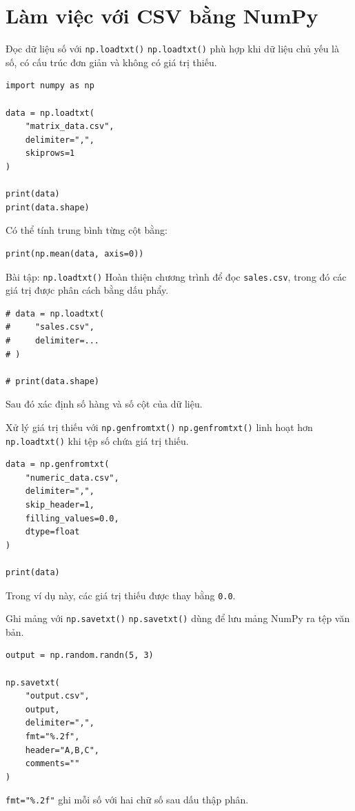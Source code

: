 \documentclass[aspectratio=169,11pt]{beamer}
\newcommand{\code}[1]{\texttt{#1}}
\begin{document}
\section{Làm việc với CSV bằng NumPy}

\begin{frame}[fragile]{Đọc dữ liệu số với \code{np.loadtxt()}}
\code{np.loadtxt()} phù hợp khi dữ liệu chủ yếu là số, có cấu trúc đơn giản và không có giá trị thiếu.

\begin{lstlisting}[style=pythonstyle]
import numpy as np

data = np.loadtxt(
    "matrix_data.csv",
    delimiter=",",
    skiprows=1
)

print(data)
print(data.shape)
\end{lstlisting}

Có thể tính trung bình từng cột bằng:
\begin{lstlisting}[style=pythonstyle]
print(np.mean(data, axis=0))
\end{lstlisting}
\end{frame}

\begin{frame}[fragile]{Bài tập: \code{np.loadtxt()}}
Hoàn thiện chương trình để đọc \code{sales.csv}, trong đó các giá trị được phân cách bằng dấu phẩy.

\begin{lstlisting}[style=pythonstyle]
# data = np.loadtxt(
#     "sales.csv",
#     delimiter=...
# )

# print(data.shape)
\end{lstlisting}

Sau đó xác định số hàng và số cột của dữ liệu.
\end{frame}

\begin{frame}[fragile]{Xử lý giá trị thiếu với \code{np.genfromtxt()}}
\code{np.genfromtxt()} linh hoạt hơn \code{np.loadtxt()} khi tệp số chứa giá trị thiếu.

\begin{lstlisting}[style=pythonstyle]
data = np.genfromtxt(
    "numeric_data.csv",
    delimiter=",",
    skip_header=1,
    filling_values=0.0,
    dtype=float
)

print(data)
\end{lstlisting}

Trong ví dụ này, các giá trị thiếu được thay bằng \code{0.0}.
\end{frame}

\begin{frame}[fragile]{Ghi mảng với \code{np.savetxt()}}
\code{np.savetxt()} dùng để lưu mảng NumPy ra tệp văn bản.

\begin{lstlisting}[style=pythonstyle]
output = np.random.randn(5, 3)

np.savetxt(
    "output.csv",
    output,
    delimiter=",",
    fmt="%.2f",
    header="A,B,C",
    comments=""
)
\end{lstlisting}

\code{fmt="\%.2f"} ghi mỗi số với hai chữ số sau dấu thập phân.
\end{frame}
\end{document}
